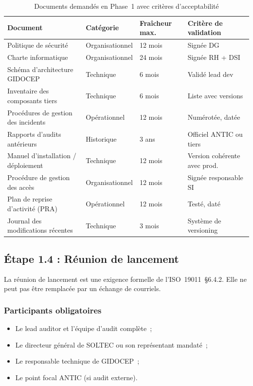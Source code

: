 \documentclass[12pt,a4paper,oneside]{report}
\begin{document}
\begin{table}[H]
\centering\small
\caption{Documents demand\'es en Phase~1 avec crit\`eres d'acceptabilit\'e}
\label{tab:docs_p1}
\begin{tabularx}{\textwidth}{p{4.5cm}p{2cm}p{2cm}X}
\toprule
\rowcolor{theadcolor}
\color{white}\textbf{Document} &
\color{white}\textbf{Cat\'egorie} &
\color{white}\textbf{Fra\^icheur max.} &
\color{white}\textbf{Crit\`ere de validation} \\
\midrule
Politique de s\'ecurit\'e & Organisationnel & 12 mois & Sign\'ee DG \\
Charte informatique & Organisationnel & 24 mois & Sign\'ee RH + DSI \\
Sch\'ema d'architecture GIDOCEP & Technique & 6 mois & Valid\'e lead dev \\
Inventaire des composants tiers & Technique & 6 mois & Liste avec versions \\
Proc\'edures de gestion des incidents & Op\'erationnel & 12 mois & Num\'erot\'ee, dat\'ee \\
Rapports d'audits ant\'erieurs & Historique & 3 ans & Officiel ANTIC ou tiers \\
Manuel d'installation / d\'eploiement & Technique & 12 mois & Version coh\'erente avec prod. \\
Proc\'edure de gestion des acc\`es & Organisationnel & 12 mois & Sign\'ee responsable SI \\
Plan de reprise d'activit\'e (PRA) & Op\'erationnel & 12 mois & Test\'e, dat\'e \\
Journal des modifications r\'ecentes & Technique & 3 mois & Syst\`eme de versioning \\
\bottomrule
\end{tabularx}
\end{table}

\subsection{\'Etape 1.4 : R\'eunion de lancement}

La r\'eunion de lancement est une exigence formelle de l'ISO~19011~§6.4.2. Elle
ne peut pas \^etre remplac\'ee par un \'echange de courriels.

\subsubsection{Participants obligatoires}

\begin{itemize}[label={\color{gold}}, leftmargin=*, itemsep=2pt]
\item Le lead auditor et l'\'equipe d'audit compl\`ete~;
\item Le directeur g\'en\'eral de SOLTEC ou son repr\'esentant mandaté~;
\item Le responsable technique de GIDOCEP~;
\item Le point focal ANTIC (si audit externe).
\end{itemize}
\end{document}
